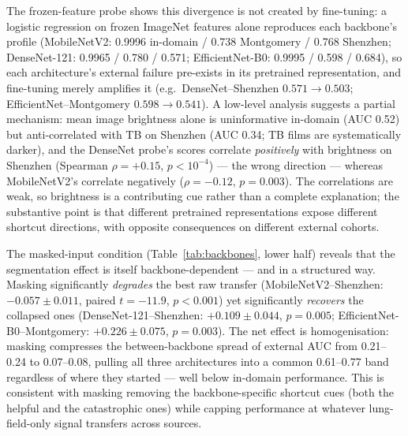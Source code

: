 \documentclass{article}
\begin{document}
The frozen-feature probe shows this divergence is not created by fine-tuning: a logistic regression
on frozen ImageNet features alone reproduces each backbone's profile (MobileNetV2: 0.9996
in-domain / 0.738 Montgomery / 0.768 Shenzhen; DenseNet-121: 0.9965 / 0.780 / 0.571;
EfficientNet-B0: 0.9995 / 0.598 / 0.684), so each architecture's external failure pre-exists in its
pretrained representation, and fine-tuning merely amplifies it (e.g.\ DenseNet--Shenzhen
$0.571 \rightarrow 0.503$; EfficientNet--Montgomery $0.598 \rightarrow 0.541$). A low-level
analysis suggests a partial mechanism: mean image brightness alone is uninformative in-domain
(AUC 0.52) but anti-correlated with TB on Shenzhen (AUC 0.34; TB films are systematically darker),
and the DenseNet probe's scores correlate \emph{positively} with brightness on Shenzhen (Spearman
$\rho = +0.15$, $p < 10^{-4}$) --- the wrong direction --- whereas MobileNetV2's correlate
negatively ($\rho = -0.12$, $p = 0.003$). The correlations are weak, so brightness is a
contributing cue rather than a complete explanation; the substantive point is that different
pretrained representations expose different shortcut directions, with opposite consequences on
different external cohorts.

The masked-input condition (Table~\ref{tab:backbones}, lower half) reveals that the segmentation
effect is itself backbone-dependent --- and in a structured way. Masking significantly
\emph{degrades} the best raw transfer (MobileNetV2--Shenzhen: $-0.057 \pm 0.011$, paired
$t = -11.9$, $p < 0.001$) yet significantly \emph{recovers} the collapsed ones
(DenseNet-121--Shenzhen: $+0.109 \pm 0.044$, $p = 0.005$; EfficientNet-B0--Montgomery:
$+0.226 \pm 0.075$, $p = 0.003$). The net effect is homogenisation: masking compresses the
between-backbone spread of external AUC from 0.21--0.24 to 0.07--0.08, pulling all three
architectures into a common 0.61--0.77 band regardless of where they started --- well below
in-domain performance. This is consistent with masking removing the backbone-specific shortcut cues
(both the helpful and the catastrophic ones) while capping performance at whatever
lung-field-only signal transfers across sources.
\end{document}
